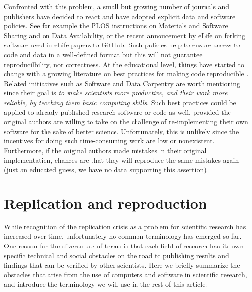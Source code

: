 \documentclass[a4paper,10pt, twocolumn]{article}
\begin{document}
Confronted with this problem, a small but growing number of journals and
publishers have decided to react and have adopted explicit data and software
policies. See for example the PLOS instructions on
\href{http://journals.plos.org/plosone/s/materials-and-software-sharing}{Materials
  and Software Sharing} and
on \href{http://journals.plos.org/plosone/s/data-availability}{Data Availability},
or the
\href{https://elifesciences.org/elife-news/inside-elife-forking-software-used-elife-papers-github}{recent
  annoucement} by eLife on forking software used in eLife papers to GitHub.
Such policies help to ensure access to code and data in a well-defined format
\citep{perkel:2016} but this will not guarantee reproducilbility, nor
correctness. At the educational level, things have started to change with a
growing literature on best practices for making code reproducible
\citep{sandve:2013, crook:2013, wilson:2014, halchenko:2015, janz:2015,
  hinsen:2015}. Related initiatives such as Software and Data Carpentry
\citep{wilson:2016} are worth mentioning since their goal is {\em to make
  scientists more productive, and their work more reliable, by teaching them
  basic computing skills}. Such best practices could be applied to already published research software or code as well, provided the original authors are willing to take on the challenge of 
  re-implementing their own software for the sake of better science. Unfortunately, this is unlikely since the
incentives for doing such time-consuming work are low or nonexistent.
Furthermore, if the original authors made mistakes in their original
implementation, chances are that they will reproduce the same mistakes again (just an educated guess, we have no data supporting this
assertion).\\



\section*{Replication and reproduction}
\label{sec:replication-reproduction}
While recognition of the replication crisis as a problem
for scientific research has increased over time, unfortunately no 
common terminology has emerged so far. One reason for
the diverse use of terms is that each field of research has its own
specific technical and social obstacles on the road to publishing
results and findings that can be verified by other scientists. Here we
briefly summarize the obstacles that arise from the use of computers
and software in scientific research, and introduce the terminology we
will use in the rest of this article:\\
\end{document}
